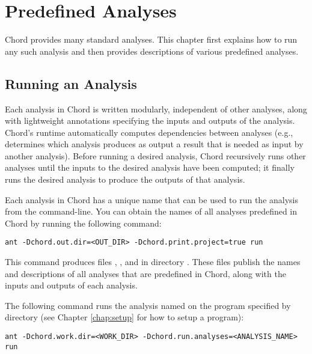 \chapter{Predefined Analyses}
\label{chap:predefined}

Chord provides many standard analyses.
This chapter first explains how to run any such analysis and then provides
descriptions of various predefined analyses.

\section{Running an Analysis}
\label{sec:running-predefined}

Each analysis in Chord is written modularly, independent of other analyses,
along with lightweight annotations specifying the inputs and outputs of the
analysis.  Chord's runtime automatically computes dependencies between analyses
(e.g., determines which analysis produces as output a result that is needed as
input by another analysis).  Before running a desired analysis, Chord
recursively runs other analyses until the inputs to the desired analysis have
been computed; it finally runs the desired analysis to produce the outputs of
that analysis.

Each analysis in Chord has a unique name that can be used to run the
analysis from the command-line.  You can obtain the names of all analyses
predefined in Chord by running the following command:

\begin{framed}
\begin{verbatim}
ant -Dchord.out.dir=<OUT_DIR> -Dchord.print.project=true run
\end{verbatim}
\end{framed}

This command produces files , ,
and  in directory .  These
files publish the names and descriptions of all analyses that are predefined in
Chord, along with the inputs and outputs of each analysis.

The following command runs the analysis
named  on the program specified by directory 
(see Chapter \ref{chap:setup} for how to setup a program):

\begin{framed}
\begin{verbatim}
ant -Dchord.work.dir=<WORK_DIR> -Dchord.run.analyses=<ANALYSIS_NAME> run
\end{verbatim}
\end{framed}

